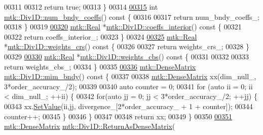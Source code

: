 \begin{DoxyCode}
{{00311 
00312   \textcolor{keywordflow}{return} \textcolor{keyword}{true};
00313 \}
00314 
\hypertarget{mtk__div__1d_8cc_source_l00315}{}\hyperlink{classmtk_1_1Div1D_a975cb2a91ed6806f6fc0a3a5b01b01b1}{00315} \textcolor{keywordtype}{int} \hyperlink{classmtk_1_1Div1D_a975cb2a91ed6806f6fc0a3a5b01b01b1}{mtk::Div1D::num\_bndy\_coeffs}()\textcolor{keyword}{ const }\{
00316 
00317   \textcolor{keywordflow}{return} num\_bndy\_coeffs\_;
00318 \}
00319 
\hypertarget{mtk__div__1d_8cc_source_l00320}{}\hyperlink{classmtk_1_1Div1D_a0916b5e84b019b4b6a33d0a45d829513}{00320} \hyperlink{group__c01-roots_gac080bbbf5cbb5502c9f00405f894857d}{mtk::Real} *\hyperlink{classmtk_1_1Div1D_a0916b5e84b019b4b6a33d0a45d829513}{mtk::Div1D::coeffs\_interior}()\textcolor{keyword}{ const }\{
00321 
00322   \textcolor{keywordflow}{return} coeffs\_interior\_;
00323 \}
00324 
\hypertarget{mtk__div__1d_8cc_source_l00325}{}\hyperlink{classmtk_1_1Div1D_ab5c791285e7e51a85b8c62a1b0ab9126}{00325} \hyperlink{group__c01-roots_gac080bbbf5cbb5502c9f00405f894857d}{mtk::Real} *\hyperlink{classmtk_1_1Div1D_ab5c791285e7e51a85b8c62a1b0ab9126}{mtk::Div1D::weights\_crs}()\textcolor{keyword}{ const }\{
00326 
00327   \textcolor{keywordflow}{return} weights\_crs\_;
00328 \}
00329 
\hypertarget{mtk__div__1d_8cc_source_l00330}{}\hyperlink{classmtk_1_1Div1D_a5d4fe8c61ce41cb1134a3f9cb16deb59}{00330} \hyperlink{group__c01-roots_gac080bbbf5cbb5502c9f00405f894857d}{mtk::Real} *\hyperlink{classmtk_1_1Div1D_a5d4fe8c61ce41cb1134a3f9cb16deb59}{mtk::Div1D::weights\_cbs}()\textcolor{keyword}{ const }\{
00331 
00332 
00333   \textcolor{keywordflow}{return} weights\_cbs\_;
00334 \}
00335 
\hypertarget{mtk__div__1d_8cc_source_l00336}{}\hyperlink{classmtk_1_1Div1D_a2c844ef39825e73e4024d35fcdd42b12}{00336} \hyperlink{classmtk_1_1DenseMatrix}{mtk::DenseMatrix} \hyperlink{classmtk_1_1Div1D_a2c844ef39825e73e4024d35fcdd42b12}{mtk::Div1D::mim\_bndy}()\textcolor{keyword}{ const }\{
00337 
00338   \hyperlink{classmtk_1_1DenseMatrix}{mtk::DenseMatrix} xx(dim\_null\_, 3*order\_accuracy\_/2);
00339 
00340   \textcolor{keyword}{auto} counter = 0;
00341   \textcolor{keywordflow}{for} (\textcolor{keyword}{auto} ii = 0; ii < dim\_null\_; ++ii) \{
00342     \textcolor{keywordflow}{for}(\textcolor{keyword}{auto} jj = 0; jj < 3*order\_accuracy\_/2; ++jj) \{
00343       xx.\hyperlink{classmtk_1_1DenseMatrix_a784ce5784109ac86bfb9d8562b334b13}{SetValue}(ii,jj, divergence\_[2*order\_accuracy\_ + 1 + counter]);
00344       counter++;
00345     \}
00346   \}
00347 
00348   \textcolor{keywordflow}{return} xx;
00349 \}
00350 
\hypertarget{mtk__div__1d_8cc_source_l00351}{}\hyperlink{classmtk_1_1Div1D_a213fddbaaf86e4840c6a9649b69c2d49}{00351} \hyperlink{classmtk_1_1DenseMatrix}{mtk::DenseMatrix} \hyperlink{classmtk_1_1Div1D_a213fddbaaf86e4840c6a9649b69c2d49}{mtk::Div1D::ReturnAsDenseMatrix}(
}}
\end{DoxyCode}

